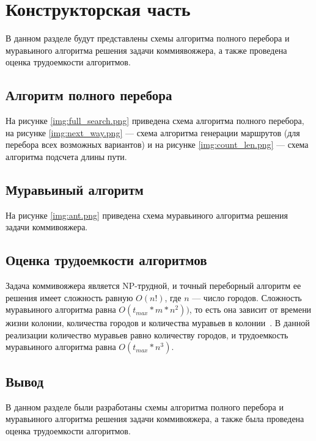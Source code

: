 \chapter{Конструкторская часть}
В данном разделе будут представлены схемы алгоритма полного перебора и муравьиного алгоритма решения задачи коммиявояжера, а также проведена оценка трудоемкости алгоритмов.

\section{Алгоритм полного перебора}
На рисунке \ref{img:full_search.png} приведена схема алгоритма полного перебора, на рисунке \ref{img:next_way.png} --- схема алгоритма генерации маршрутов (для перебора всех возможных вариантов) и на рисунке \ref{img:count_len.png} --- схема алгоритма подсчета длины пути.
\clearpage
{}
\clearpage

\section{Муравьиный алгоритм}
На рисунке \ref{img:ant.png} приведена схема муравьиного алгоритма решения задачи коммивояжера.
\clearpage
{}
\FloatBarrier

\section{Оценка трудоемкости алгоритмов}
Задача коммивояжера является NP-трудной, и точный переборный алгоритм ее решения имеет сложность равную $O(n!)$, где $n$ --- число городов. Сложность муравьиного алгоритма равна $O(t_{max}*m*n^2))$, то есть она зависит от времени жизни колонии, количества городов и количества муравьев в колонии~\cite{np}. В данной реализации количество муравьев равно количеству городов, и трудоемкость муравьиного алгоритма равна $O(t_{max} * n^3)$.
\section*{Вывод}
В данном разделе были разработаны схемы алгоритма полного перебора и муравьиного алгоритма решения задачи коммивояжера, а также была проведена оценка трудоемкости алгоритмов.